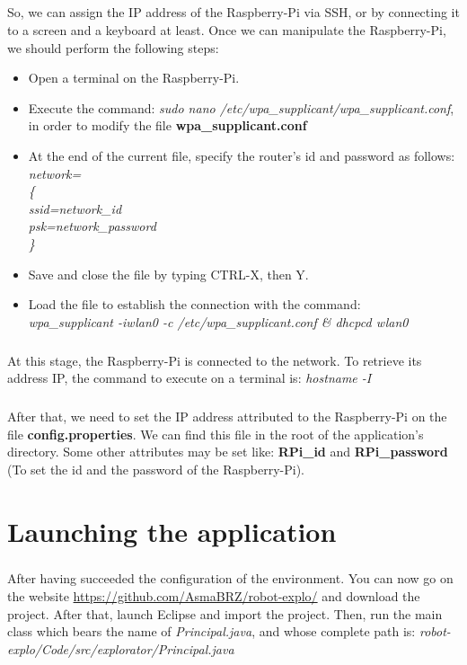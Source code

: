 \documentclass[12pt]{report}
\begin{document}
\paragraph{}
So, we can assign the IP address of the Raspberry-Pi via SSH, or by connecting it to a screen and a keyboard at least. Once we can manipulate the Raspberry-Pi, we should perform the following steps:
\begin{itemize}
    \item Open a terminal on the Raspberry-Pi.
    \item Execute the command: \emph{sudo nano /etc/wpa\_supplicant/wpa\_supplicant.conf}, in order to modify the file \textbf{wpa\_supplicant.conf}
    \item At the end of the current file, specify the router's id and password as follows: 
    \\\emph{
    network=\\ \{\\
    ssid=network\_id \\
    psk=network\_password \\
    \}}
    \item Save and close the file by typing CTRL-X, then Y.
    \item Load the file to establish the connection with the command: \\ \emph{wpa\_supplicant -iwlan0 -c /etc/wpa\_supplicant.conf \& dhcpcd wlan0}
\end{itemize}
\paragraph{}
At this stage, the Raspberry-Pi is connected to the network. To retrieve its address IP, the command to execute on a terminal is: \emph{hostname -I}
\paragraph{}
After that, we need to set the IP address attributed to the Raspberry-Pi on the file \textbf{config.properties}. We can find this file in the root of the application's directory. Some other attributes may be set like: \textbf{RPi\_id} and \textbf{RPi\_password} (To set the id and the password of the Raspberry-Pi).

\chapter{Launching the application}
\paragraph{}
After having succeeded the configuration of the environment. You can now go on the website \url{https://github.com/AsmaBRZ/robot-explo/} and download the project. After that, launch Eclipse and import the project. Then, run the main class which bears the name of \emph{Principal.java}, and whose complete path is: \emph{robot-explo/Code/src/explorator/Principal.java} 
\end{document}
